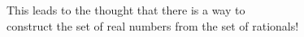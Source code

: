 \documentclass[preview]{standalone}
\begin{document}
\begin{center}
This leads to the thought that there is a way to \\construct the set of real numbers from the set of rationals!
\end{center}
\end{document}
